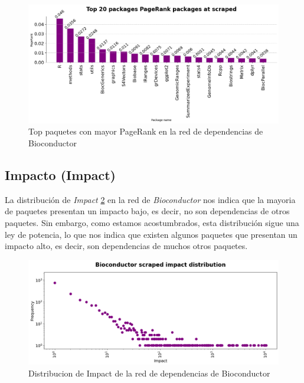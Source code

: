 \begin{figure}[ht!]
    \begin{center}
        \includegraphics[width=1\textwidth]{img/bioconductor/top_pagerrank_packages.png}
        \caption{Top paquetes con mayor PageRank en la red de dependencias de Bioconductor}
        \label{fig:bioconductor_top_pagerank_packages}
    \end{center}
\end{figure}

\subsection{Impacto (Impact)}

La distribución de \textit{Impact} \ref{fig:bioconductor_impact_dist} en la red de \textit{Bioconductor} nos indica
que la mayoria de paquetes presentan un impacto bajo, es decir, no son dependencias de otros paquetes. Sin embargo,
como estamos acostumbrados, esta distribución sigue una ley de potencia, lo que nos indica que existen algunos paquetes
que presentan un impacto alto, es decir, son dependencias de muchos otros paquetes.

\begin{figure}[ht!]
    \begin{center}
        \includegraphics[width=1\textwidth]{img/bioconductor/impact.png}
        \caption{Distribucion de Impact de la red de dependencias de Bioconductor}
        \label{fig:bioconductor_impact_dist}
    \end{center}
\end{figure}

